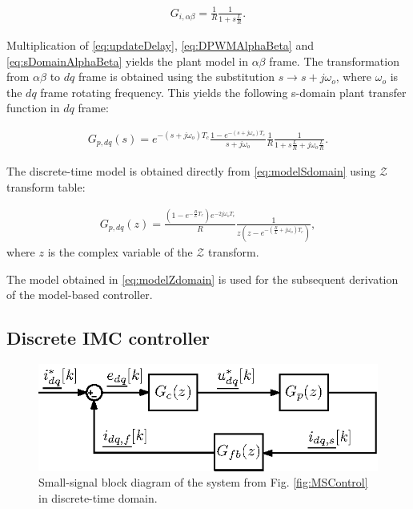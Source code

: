 \documentclass[journal]{IEEEtran}
\begin{document}
\begin{equation}
\begin{aligned}
G_{i,\alpha \beta} = \frac{1}{R} \frac{1}{1 + s \frac{L}{R}}.
\label{eq:sDomainAlphaBeta} 
\end{aligned}    
\end{equation}


Multiplication of \eqref{eq:updateDelay}, \eqref{eq:DPWMAlphaBeta} and \eqref{eq:sDomainAlphaBeta} yields the plant model in $\alpha \beta$ frame.
The transformation from $\alpha \beta$ to $dq$ frame is obtained using the substitution $s \rightarrow s + j \omega_o$, where $\omega_o$ is the $dq$ frame rotating frequency.
This yields the following s-domain plant transfer function in $dq$ frame:

\begin{equation}
\begin{aligned}
G_{p,dq}(s) = e^{-(s+j\omega_o) T_c} \frac{1-e^{-(s+j\omega_o) T_c}}{s+j\omega_o} \frac{1}{R} \frac{1}{1 + s \frac{L}{R} + j\omega_o \frac{L}{R}}.
\label{eq:modelSdomain} 
\end{aligned}    
\end{equation}
 
The discrete-time model is obtained directly from \eqref{eq:modelSdomain} using $\mathcal{Z}$ transform table:

\begin{equation}
\begin{aligned}
G_{p,dq}(z) = \frac{\left( 1 - e^{-\frac{R}{L}T_c}\right) e^{-2j\omega_o T_c}}{R} \frac{1}{z \left( z - e^{- \left( \frac{R}{L} + j\omega_o\right) T_c}\right)},
\label{eq:modelZdomain} 
\end{aligned}    
\end{equation}
where $z$ is the complex variable of the $\mathcal{Z}$ transform.

The model obtained in \eqref{eq:modelZdomain} is used for the subsequent derivation of the model-based controller.
 
\subsection{Discrete IMC controller}


\begin{figure}[t!]
    \centerline{\includegraphics[width=0.95\linewidth]{figures/small_signal.eps}}
    \caption{Small-signal block diagram of the system from Fig. \ref{fig:MSControl} in discrete-time domain.}
    \label{fig:SmallSignal}
\end{figure}
\end{document}
